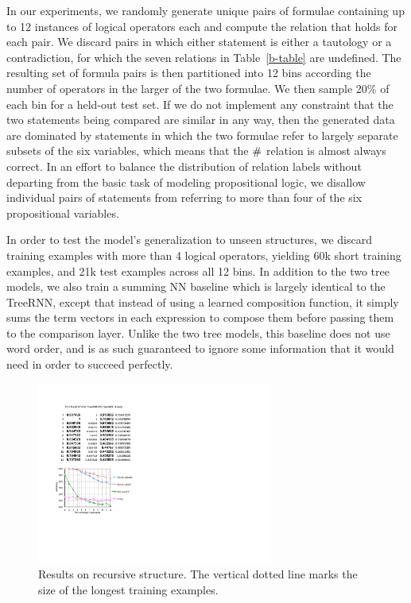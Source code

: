 In our experiments, we randomly generate unique pairs 
of formulae containing up to 12 instances of logical operators each and compute the relation that holds for each pair.
We discard pairs in which either statement is either a tautology or a
contradiction, for which the seven relations in
Table~\ref{b-table} are undefined. The resulting set of formula pairs is
then partitioned into 12 bins according the number of operators in
the larger of the two formulae. We then sample 20\% of each
bin for a held-out test set.
If we do not implement any constraint that the two statements being
compared are similar in any way, then the generated data are dominated
by statements in which the two formulae refer to largely separate
subsets of the six variables, which means that the $\mathbin{\#}$ relation
is almost always correct.  In an effort to balance the distribution of
relation labels without departing from the basic task of modeling
propositional logic, we disallow individual pairs of statements from
referring to more than four of the six propositional variables.

In order to test the model's generalization to unseen structures, we discard
training examples with more than 4 logical operators, yielding 60k short training examples,
and 21k test examples across all 12 bins.
In addition to the two tree models, we also train a summing NN baseline
which is largely identical to the TreeRNN, except that instead of using a learned composition function,
it simply sums the term vectors in each expression to compose them before passing them to the comparison layer. Unlike the two tree models, this baseline does not use word order,
and is as such guaranteed to ignore some information that it would need in order to succeed perfectly.

\begin{figure}[t]
  \centering
  \includegraphics[width=3.05in]{decayfig.pdf}

  \caption{Results on recursive structure. The vertical dotted line marks the size of the longest training examples.}





    
  \label{prop-results} 
\end{figure}


